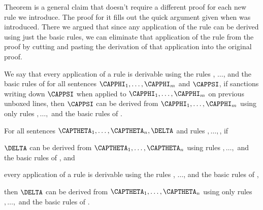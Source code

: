 Theorem  is a general claim that doesn't require a different proof for each new rule we introduce. 
The proof for it fills out the quick argument given when  was introduced. There we argued that since any application of the rule can be derived using just the basic rules, we can eliminate that application of the rule from the proof by cutting and pasting the derivation of that application into the original proof. 
\begin{majorILnc}{}
We say that every application of a rule  is derivable using the rules , $\ldots$,  and the basic rules of \GSD{} \Iff for all \GSL{} sentences $\CAPPHI_1,\ldots,\CAPPHI_{\integer{m}}$ and $\CAPPSI$, if  sanctions writing down $\CAPPSI$ when applied to $\CAPPHI_1,\ldots,\CAPPHI_{\integer{m}}$ on previous unboxed lines, then $\CAPPSI$ can be derived from $\CAPPHI_1,\ldots,\CAPPHI_{\integer{m}}$ using only rules $,\ldots,$ and the basic rules of \GSD{}.
\end{majorILnc}
\begin{THEOREM}{}
For all \GSL{} sentences $\CAPTHETA_1,\ldots,\CAPTHETA_{\integer{n}},\DELTA$ and rules $,\ldots,$, if
\begin{cenumerate}
\item $\DELTA$ can be derived from $\CAPTHETA_1,\ldots,\CAPTHETA_{\integer{n}}$ using rules $,\ldots,$ and the basic rules of \GSD{}, and
\item every application of a rule  is derivable using the rules , $\ldots$,  and the basic rules of \GSD{},
\end{cenumerate}
then $\DELTA$ can be derived from $\CAPTHETA_1,\ldots,\CAPTHETA_{\integer{n}}$ using only rules $,\ldots,$ and the basic rules of \GSD{}.
\end{THEOREM}
